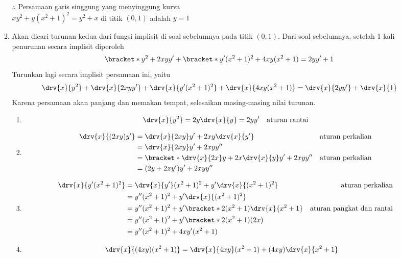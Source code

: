 \begin{enumerate}[leftmargin=*, label={\arabic*}.]
\begin{enumerate}[label={\alph*}.]
    $\therefore$ Persamaan garis singgung yang menyinggung kurva \\
    $xy^{2}+y(x^{2}+1)^{2} = y^{2}+x$ di titik $(0,1)$ adalah $y=1$
    \item Akan dicari turunan kedua dari fungsi implisit di soal sebelumnya 
    pada titik $(0,1)$. Dari soal sebelumnya, setelah 1 kali penurunan secara 
    implisit diperoleh
    \[
        \bracket*{y^{2} + 2xyy'} + \bracket*{y'(x^{2}+1)^{2} 
        + 4xy(x^{2}+1)}= 2yy' + 1
    \]
    Turunkan lagi secara implisit persamaan ini, yaitu
    \[
        \drv{x}{y^{2}}+\drv{x}{2xyy'}+\drv{x}{y'(x^{2}+1)^{2}}+\drv{x}{4xy(x^{2}+1)}
        =\drv{x}{2yy'}+\drv{x}{1}
    \]
    Karena persamaan akan panjang dan memakan tempat, selesaikan masing-masing nilai 
    turunan.
    \begin{enumerate}[label={\arabic*})]
        \item 
        \[
            \drv{x}{y^{2}} = 2y\drv{x}{y} = 2yy' \quad \text{aturan rantai}
        \]
        \item 
        \begin{align*}
            \drv{x}{(2xy)y'} 
            &= \drv{x}{2xy}y' + 2xy\drv{x}{y'}
            &\text{aturan perkalian}\\
            &= \drv{x}{2xy}y' + 2xyy''\\
            &= \bracket*{\drv{x}{2x}y + 2x\drv{x}{y}}y' + 2xyy''
            &\text{aturan perkalian}\\
            &=(2y+2xy')y'+2xyy''
        \end{align*}
        \item 
        \begin{align*}
            \drv{x}{y'(x^{2}+1)^{2}} 
            &= \drv{x}{y'}(x^{2}+1)^{2}+y'\drv{x}{(x^{2}+1)^{2}}
            &\text{aturan perkalian}\\
            &= y''(x^{2}+1)^{2} + y'\drv{x}{(x^{2}+1)^{2}}\\
            &=y''(x^{2}+1)^{2} + y'\bracket*{2(x^{2}+1)\drv{x}{x^{2}+1}}
            &\text{aturan pangkat dan rantai}\\
            &=y''(x^{2}+1)^{2} + y'\bracket*{2(x^{2}+1)(2x)}\\
            &=y''(x^{2}+1)^{2} + 4xy'(x^{2}+1)
        \end{align*}
        \item 
        \begin{align*}
            \drv{x}{(4xy)(x^{2}+1)}
            &=\drv{x}{4xy}(x^{2}+1) + (4xy)\drv{x}{x^{2}+1}

\end{align*}
\end{enumerate}
\end{enumerate}
\end{enumerate}
